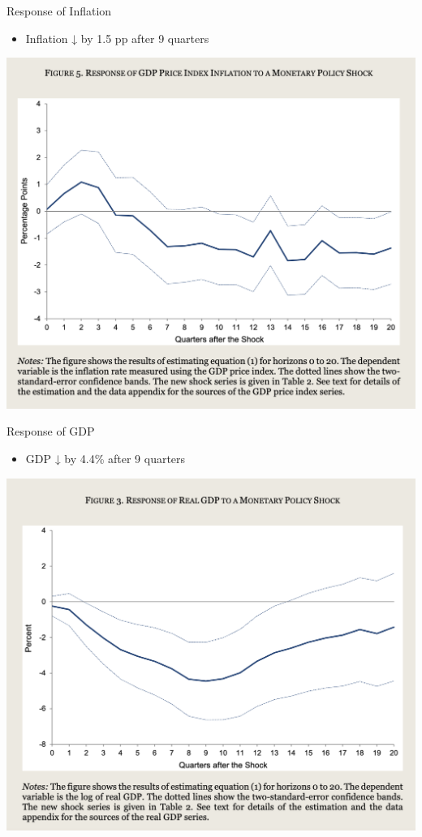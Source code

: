 \documentclass{beamer}
\begin{document}
\begin{frame}{Response of Inflation}
  \begin{itemize}
    \item Inflation ↓ by 1.5 pp after 9 quarters
  \end{itemize}
  \centering
  \includegraphics[height=1\textheight]{Graphs/GDPIndexInflation Response.png}
\end{frame}

\begin{frame}{Response of GDP}
  \begin{itemize}
    \item GDP ↓ by 4.4\% after 9 quarters
  \end{itemize}
    \centering
  \includegraphics[height=1\textheight]{Graphs/RealGDP Response.png}
\end{frame}
\end{document}
